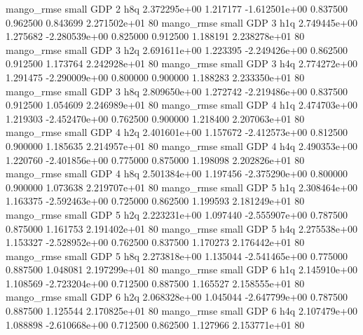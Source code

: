       mango_rmse      small      GDP                 2                  h8q 2.372295e+00      1.217177 -1.612501e+00 0.837500 0.962500       0.843699 2.271502e+01 80
       mango_rmse      small      GDP                 3                  h1q 2.749445e+00      1.275682 -2.280539e+00 0.825000 0.912500       1.188191 2.238278e+01 80
       mango_rmse      small      GDP                 3                  h2q 2.691611e+00      1.223395 -2.249426e+00 0.862500 0.912500       1.173764 2.242928e+01 80
       mango_rmse      small      GDP                 3                  h4q 2.774272e+00      1.291475 -2.290009e+00 0.800000 0.900000       1.188283 2.233350e+01 80
       mango_rmse      small      GDP                 3                  h8q 2.809650e+00      1.272742 -2.219486e+00 0.837500 0.912500       1.054609 2.246989e+01 80
       mango_rmse      small      GDP                 4                  h1q 2.474703e+00      1.219303 -2.452470e+00 0.762500 0.900000       1.218400 2.207063e+01 80
       mango_rmse      small      GDP                 4                  h2q 2.401601e+00      1.157672 -2.412573e+00 0.812500 0.900000       1.185635 2.214957e+01 80
       mango_rmse      small      GDP                 4                  h4q 2.490353e+00      1.220760 -2.401856e+00 0.775000 0.875000       1.198098 2.202826e+01 80
       mango_rmse      small      GDP                 4                  h8q 2.501384e+00      1.197456 -2.375290e+00 0.800000 0.900000       1.073638 2.219707e+01 80
       mango_rmse      small      GDP                 5                  h1q 2.308464e+00      1.163375 -2.592463e+00 0.725000 0.862500       1.199593 2.181249e+01 80
       mango_rmse      small      GDP                 5                  h2q 2.223231e+00      1.097440 -2.555907e+00 0.787500 0.875000       1.161753 2.191402e+01 80
       mango_rmse      small      GDP                 5                  h4q 2.275538e+00      1.153327 -2.528952e+00 0.762500 0.837500       1.170273 2.176442e+01 80
       mango_rmse      small      GDP                 5                  h8q 2.273818e+00      1.135044 -2.541465e+00 0.775000 0.887500       1.048081 2.197299e+01 80
       mango_rmse      small      GDP                 6                  h1q 2.145910e+00      1.108569 -2.723204e+00 0.712500 0.887500       1.165527 2.158555e+01 80
       mango_rmse      small      GDP                 6                  h2q 2.068328e+00      1.045044 -2.647799e+00 0.787500 0.887500       1.125544 2.170825e+01 80
       mango_rmse      small      GDP                 6                  h4q 2.107479e+00      1.088898 -2.610668e+00 0.712500 0.862500       1.127966 2.153771e+01 80
